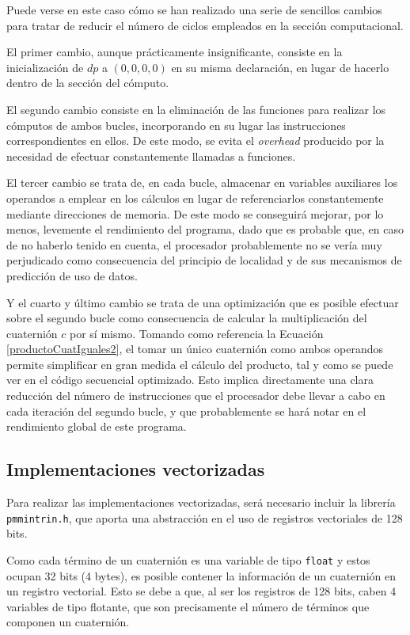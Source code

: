\documentclass[conference]{IEEEtran}
\begin{document}
Puede verse en este caso cómo se han realizado una serie de sencillos cambios para tratar de reducir el número de ciclos empleados en la sección computacional.

El primer cambio, aunque prácticamente insignificante, consiste en la inicialización de $dp$ a $(0, 0, 0, 0)$ en su misma declaración, en lugar de hacerlo dentro de la sección del cómputo.

El segundo cambio consiste en la eliminación de las funciones para realizar los cómputos de ambos bucles, incorporando en su lugar las instrucciones correspondientes en ellos. De este modo, se evita el \textit{overhead} producido por la necesidad de efectuar constantemente llamadas a funciones.

El tercer cambio se trata de, en cada bucle, almacenar en variables auxiliares los operandos a emplear en los cálculos en lugar de referenciarlos constantemente mediante direcciones de memoria. De este modo se conseguirá mejorar, por lo menos, levemente el rendimiento del programa, dado que es probable que, en caso de no haberlo tenido en cuenta, el procesador probablemente no se vería muy perjudicado como consecuencia del principio de localidad y de sus mecanismos de predicción de uso de datos.

Y el cuarto y último cambio se trata de una optimización que es posible efectuar sobre el segundo bucle como consecuencia de calcular la multiplicación del cuaternión $c$ por sí mismo. Tomando como referencia la Ecuación \ref{productoCuatIguales2}, el tomar un único cuaternión como ambos operandos permite simplificar en gran medida el cálculo del producto, tal y como se puede ver en el código secuencial optimizado. Esto implica directamente una clara reducción del número de instrucciones que el procesador debe llevar a cabo en cada iteración del segundo bucle, y que probablemente se hará notar en el rendimiento global de este programa.

\subsection{Implementaciones vectorizadas}

Para realizar las implementaciones vectorizadas, será necesario incluir la librería \texttt{pmmintrin.h}, que aporta una abstracción en el uso de registros vectoriales de 128 bits. 

Como cada término de un cuaternión es una variable de tipo \texttt{float} y estos ocupan 32 bits (4 bytes), es posible contener la información de un cuaternión en un registro vectorial. Esto se debe a que, al ser los registros de 128 bits, caben 4 variables de tipo flotante, que son precisamente el número de términos que componen un cuaternión.
\end{document}
